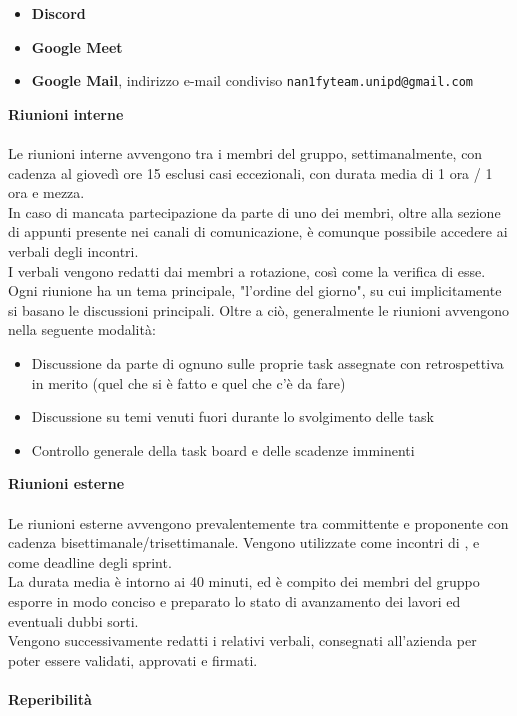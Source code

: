\begin{itemize}
  \item{\textbf{Discord}}
  \item{\textbf{Google Meet}}
  \item{\textbf{Google Mail}, indirizzo e-mail condiviso \texttt{nan1fyteam.unipd@gmail.com}}
\end{itemize}
\textbf{Riunioni interne}\\\\
Le riunioni interne avvengono tra i membri del gruppo, settimanalmente, con cadenza al giovedì ore 15 esclusi casi eccezionali, con durata media di 1 ora / 1 ora e mezza.\\
In caso di mancata partecipazione da parte di uno dei membri, oltre alla sezione di appunti presente nei canali di comunicazione, è comunque possibile accedere ai verbali degli incontri.\\
I verbali vengono redatti dai membri a rotazione, così come la verifica di esse.\\
Ogni riunione ha un tema principale, "l'ordine del giorno", su cui implicitamente si basano le discussioni principali.
Oltre a ciò, generalmente le riunioni avvengono nella seguente modalità:
\begin{itemize}
  \item{Discussione da parte di ognuno sulle proprie task assegnate con retrospettiva in merito (quel che si è fatto e quel che c'è da fare)}
  \item{Discussione su temi venuti fuori durante lo svolgimento delle task}
  \item{Controllo generale della task board e delle scadenze imminenti}
\end{itemize}
\textbf{Riunioni esterne}\\\\
Le riunioni esterne avvengono prevalentemente tra committente e proponente con cadenza bisettimanale/trisettimanale. Vengono utilizzate come incontri di , e come deadline degli sprint.\\
La durata media è intorno ai 40 minuti, ed è compito dei membri del gruppo esporre in modo conciso e preparato lo stato di avanzamento dei lavori ed eventuali dubbi sorti.\\
Vengono successivamente redatti i relativi verbali, consegnati all'azienda per poter essere validati, approvati e firmati.
\\\\
\textbf{Reperibilità}\\\\
